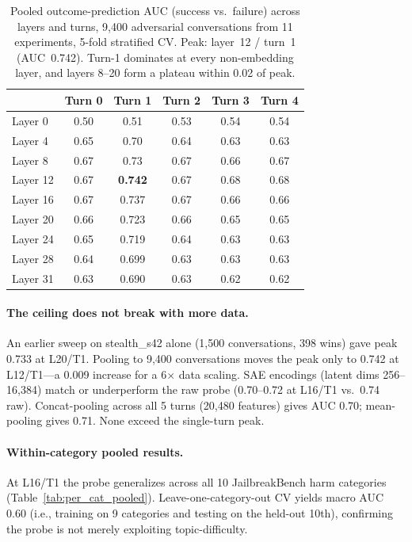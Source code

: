 \documentclass[11pt]{article}
\begin{document}
\begin{table}[h]
\centering
\begin{tabular}{lccccc}
\toprule
& \textbf{Turn 0} & \textbf{Turn 1} & \textbf{Turn 2} & \textbf{Turn 3} & \textbf{Turn 4} \\
\midrule
Layer 0  & 0.50 & 0.51 & 0.53 & 0.54 & 0.54 \\
Layer 4  & 0.65 & 0.70 & 0.64 & 0.63 & 0.63 \\
Layer 8  & 0.67 & 0.73 & 0.67 & 0.66 & 0.67 \\
Layer 12 & 0.67 & \textbf{0.742} & 0.67 & 0.68 & 0.68 \\
Layer 16 & 0.67 & 0.737 & 0.67 & 0.66 & 0.66 \\
Layer 20 & 0.66 & 0.723 & 0.66 & 0.65 & 0.65 \\
Layer 24 & 0.65 & 0.719 & 0.64 & 0.63 & 0.63 \\
Layer 28 & 0.64 & 0.699 & 0.63 & 0.63 & 0.63 \\
Layer 31 & 0.63 & 0.690 & 0.63 & 0.62 & 0.62 \\
\bottomrule
\end{tabular}
\caption{Pooled outcome-prediction AUC (success vs.\ failure) across layers and turns, 9{,}400 adversarial conversations from 11 experiments, 5-fold stratified CV. Peak: layer~12 / turn~1 (AUC~0.742). Turn-1 dominates at every non-embedding layer, and layers 8--20 form a plateau within 0.02 of peak.}
\label{tab:outcome_matrix}
\end{table}

\paragraph{The ceiling does not break with more data.}
An earlier sweep on stealth\_s42 alone (1{,}500 conversations, 398 wins) gave peak 0.733 at L20/T1. Pooling to 9{,}400 conversations moves the peak only to 0.742 at L12/T1---a 0.009 increase for a 6$\times$ data scaling.
SAE encodings (latent dims 256--16{,}384) match or underperform the raw probe (0.70--0.72 at L16/T1 vs.\ 0.74 raw).
Concat-pooling across all 5 turns (20{,}480 features) gives AUC 0.70; mean-pooling gives 0.71.
None exceed the single-turn peak.

\paragraph{Within-category pooled results.}
At L16/T1 the probe generalizes across all 10 JailbreakBench harm categories (Table~\ref{tab:per_cat_pooled}).
Leave-one-category-out CV yields macro AUC 0.60 (i.e., training on 9 categories and testing on the held-out 10th), confirming the probe is not merely exploiting topic-difficulty.
\end{document}
